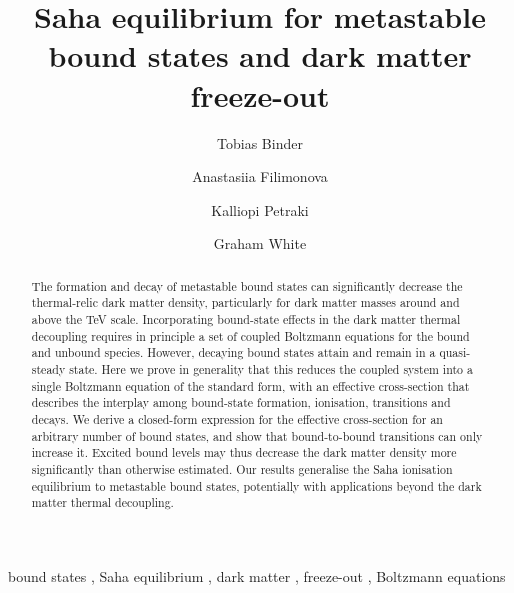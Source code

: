 \documentclass[preprint,5p,twocolumn]{elsarticle}
\begin{document}
\begin{frontmatter}


\title{Saha equilibrium for metastable bound states and dark matter freeze-out}




\author[a]{Tobias Binder}

\author[b]{Anastasiia Filimonova}

\author[b,c]{Kalliopi Petraki}

\author[a]{Graham White}


\address[a]{Kavli IPMU (WPI), UTIAS, The University of Tokyo, Kashiwa, Chiba 277-8583, Japan}
\address[b]{Nikhef, Science Park 105, 1098 XG Amsterdam, The Netherlands}
\address[c]{Sorbonne Universit\'e, CNRS, Laboratoire de Physique Th\'eorique et Hautes Energies (LPTHE), F-75252 Paris, France}







\begin{abstract}
The formation and decay of metastable bound states can significantly decrease the thermal-relic dark matter density, particularly for dark matter masses around and above the TeV scale. Incorporating bound-state effects in the dark matter thermal decoupling requires in principle a set of coupled Boltzmann equations for the bound and unbound species. However, decaying bound states attain and remain in a quasi-steady state. Here we prove in generality that this reduces the coupled system into a single Boltzmann equation of the standard form, with an effective cross-section that describes the interplay among bound-state formation, ionisation, transitions and decays. We derive a closed-form expression for the effective cross-section for an arbitrary number of bound states, and show that bound-to-bound transitions can only increase it. Excited bound levels may thus decrease the dark matter density more significantly than otherwise estimated. Our results generalise the Saha ionisation equilibrium to metastable bound states, potentially with applications beyond the dark matter thermal decoupling.
\end{abstract}

\begin{keyword}
bound states \sep
Saha equilibrium \sep
dark matter \sep
freeze-out \sep
Boltzmann equations
\end{keyword}

\end{frontmatter}
\end{document}

